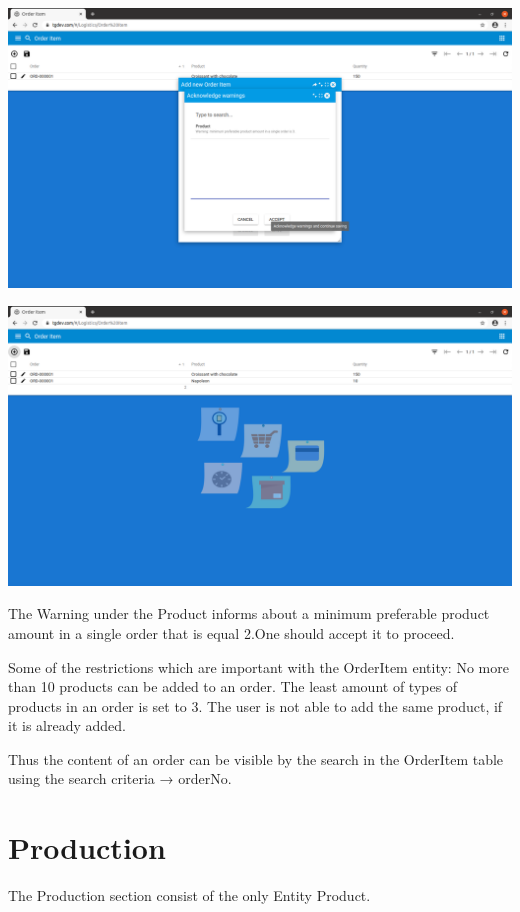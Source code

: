 \includegraphics[width=\textwidth]{sections/01-chapter/images/orderitem13.png}


\includegraphics[width=\textwidth]{sections/01-chapter/images/orderitem14.png}


The Warning under the Product informs about a minimum preferable product amount in a single order that is equal 2.One should accept it to proceed.

Some of the restrictions which are important with the OrderItem entity:
No more than 10 products can be added to an order. The least amount of types of products in an order is set to 3. The user is not able to add the same product, if it is already added.

Thus the content of an order can be visible by the search in the OrderItem table using the search criteria → orderNo.


\section{Production}

The Production section consist of the only Entity Product.

